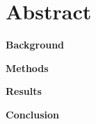 \chapter{Abstract}\label{kapitel_Abstract}

\textbf{Background}

\textbf{Methods}

\textbf{Results}

\textbf{Conclusion}